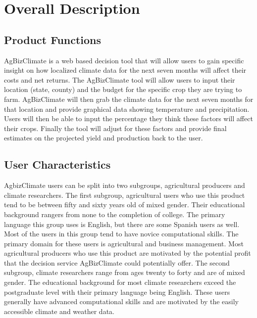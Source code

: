 \documentclass[onecolumn, draftclsnofoot,10pt, compsoc]{article}
\begin{document}
\section{Overall Description}
	\subsection {Product Functions}
				AgBizClimate is a web based decision tool that will allow users to gain specific insight on how localized climate data for the next seven months will affect their costs and net returns. The AgBizClimate tool will allow users to input their location (state, county) and the budget for the specific crop they are trying to farm. AgBizClimate will then grab the climate data for the next seven months for that location and provide graphical data showing temperature and precipitation. Users will then be able to input the percentage they think these factors will affect their crops. Finally the tool will adjust for these factors and provide final estimates on the projected yield and production back to the user.\\
	
	\subsection{User Characteristics}
		AgbizClimate users can be split into two subgroups, agricultural producers and climate researchers. The first subgroup, agricultural users who use this product tend to be between fifty and sixty years old of mixed gender. Their educational background rangers from none to the completion of college. The primary language this group uses is English, but there are some Spanish users as well. Most of the users in this group tend to have novice computational skills. The primary domain for these users is agricultural and business management. Most agricultural producers who use this product are motivated by the potential profit that the decision service AgBizClimate could potentially offer. The second subgroup, climate researchers range from ages twenty to forty and are of mixed gender. The educational background for most climate researchers  exceed the postgraduate level with their primary language being English. These users generally have advanced computational skills and are motivated by the easily accessible climate and weather data.\\
	
\end{document}
